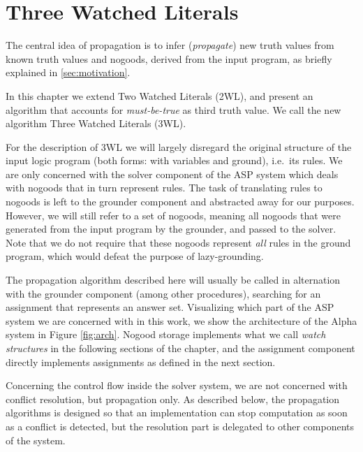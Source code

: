 \documentclass[final]{vutinfth} %
\newcommand{\mbt}{must-be-true\xspace}
\begin{document}
\chapter{Three Watched Literals}
\label{chap:prop}

The central idea of propagation is to infer (\emph{propagate}) new truth values from known truth values and nogoods, derived from the input program, as briefly explained in \ref{sec:motivation}. 

In this chapter we extend Two Watched Literals (2WL), and present an algorithm that accounts for \emph{\mbt} as third truth value. We call the new algorithm Three Watched Literals (3WL).

For the description of 3WL we will largely disregard the original structure of the input logic program (both forms: with variables and ground), i.e.~its rules. We are only concerned with the solver component of the ASP system which deals with nogoods that in turn represent rules. The task of translating rules to nogoods is left to the grounder component and abstracted away for our purposes. However, we will still refer to a set of nogoods, meaning all nogoods that were generated from the input program by the grounder, and passed to the solver. Note that we do not require that these nogoods represent \emph{all} rules in the ground program, which would defeat the purpose of lazy-grounding.

The propagation algorithm described here will usually be called in alternation with the grounder component (among other procedures), searching for an assignment that represents an answer set. Visualizing which part of the ASP system we are concerned with in this work, we show the architecture of the Alpha system in Figure \ref{fig:arch}. Nogood storage implements what we call \emph{watch structures} in the following sections of the chapter, and the assignment component directly implements assignments as defined in the next section.

Concerning the control flow inside the solver system, we are not concerned with conflict resolution, but propagation only. As described below, the propagation algorithms is designed so that an implementation can stop computation as soon as a conflict is detected, but the resolution part is delegated to other components of the system.
\end{document}
